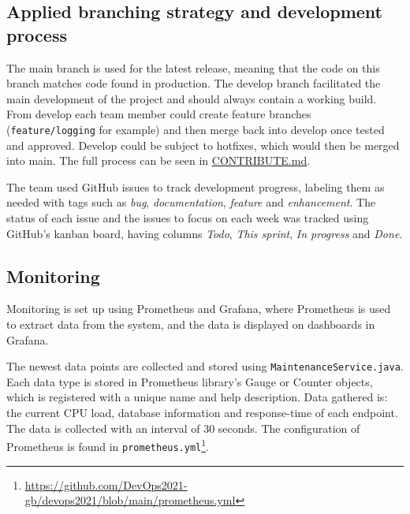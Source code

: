 \subsection{Applied branching strategy and development process} 
The main branch is used for the latest release, meaning that the code on this branch matches code found in production. The develop branch facilitated the main development of the project and should always contain a working build. From develop each team member could create feature branches (\texttt{feature/logging} for example) and then merge back into develop once tested and approved. Develop could be subject to hotfixes, which would then be merged into main. The full process can be seen in \underline{\href{https://github.com/DevOps2021-gb/devops2021/blob/main/CONTRIBUTE.md}{CONTRIBUTE.md}}.

The team used GitHub issues to track development progress, labeling them as needed with tags such as \textit{bug}, \textit{documentation}, \textit{feature} and \textit{enhancement}. The status of each issue and the issues to focus on each week was tracked using GitHub's kanban board, having columns \textit{Todo}, \textit{This sprint}, \textit{In progress} and \textit{Done}.

\subsection{Monitoring} 
\label{subsection:monitoring}
Monitoring is set up using Prometheus and Grafana, where Prometheus is used to extract data from the system, and the data is displayed on dashboards in Grafana.

The newest data points are collected and stored using \texttt{MaintenanceService.java}. Each data type is stored in Prometheus library's Gauge or Counter objects, which is registered with a unique name and help description. Data gathered is: the current CPU load, database information and response-time of each endpoint. The data is collected with an interval of 30 seconds. The configuration of Prometheus is found in \texttt{prometheus.yml}\footnote{\url{https://github.com/DevOps2021-gb/devops2021/blob/main/prometheus.yml}}.

